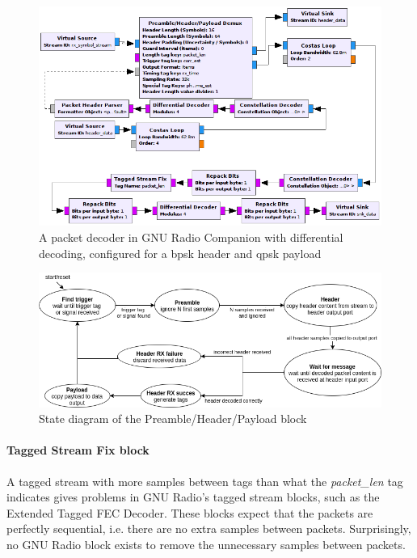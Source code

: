 \begin{figure}[H]
    \centering
    \includegraphics[width=1.0\textwidth]{img_packets/packet_decoder_grc_diff.png}
    \caption{A packet decoder in GNU Radio Companion with differential decoding, configured for a \gls{bpsk} header and \gls{qpsk} payload}
    \label{fig:packet_decoder_grc_diff}
\end{figure}






\begin{figure}[H]
    \centering
    \includegraphics[width=1.05\textwidth]{img_packets/phpd.png}
    \caption{State diagram of the Preamble/Header/Payload block}
    \label{fig:phpd}
\end{figure}

\paragraph*{Tagged Stream Fix block}
A tagged stream with more samples between tags than what the \textit{packet\_len} tag indicates gives problems in GNU Radio's {tagged stream} blocks, such as the Extended Tagged FEC Decoder. These blocks expect that the packets are perfectly sequential, i.e. there are no extra samples between packets. Surprisingly, no GNU Radio block exists to remove the unnecessary samples between packets. \medskip

